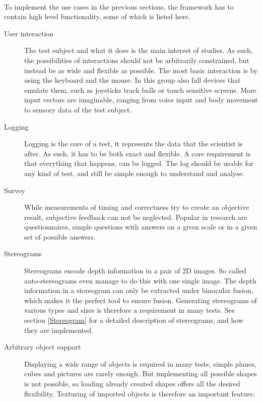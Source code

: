 \paragraph{}
To implement the use cases in the previous sections, the framework has to contain high level functionality, some of which is listed here.

\begin{description}
\item[User interaction]
The test subject and what it does is the main interest of studies.
As such, the possibilities of interactions should not be arbitrarily constrained, but instead be as wide and flexible as possible.
The most basic interaction is by using the keyboard and the mouse.
In this group also fall devices that emulate them, such as joysticks track balls or touch sensitive screens.
More input vectors are imaginable, ranging from voice input and body movement to sensory data of the test subject.

\item[Logging]
Logging is the core of a test, it represents the data that the scientist is after.
As such, it has to be both exact and flexible.
A core requirement is that everything that happens, can be logged.
The log should be usable for any kind of test, and still be simple enough to understand and analyse.

\item[Survey]
While measurements of timing and correctness try to create an objective result, subjective feedback can not be neglected.
Popular in research are questionnaires, simple questions with answers on a given scale or in a given set of possible answers.

\item[Stereograms]
Stereograms encode depth information in a pair of 2D images.
So called auto-stereograms even manage to do this with one single image.
The depth information in a stereogram can only be extracted under binocular fusion, which makes it the perfect tool to ensure fusion.
Generating stereograms of various types and sizes is therefore a requirement in many tests.
See section \ref{Stereogram} for a detailed description of stereograms, and how they are implemented.

\item[Arbitrary object support]
Displaying a wide range of objects is required in many tests, simple planes, cubes and pictures are rarely enough.
But implementing all possible shapes is not possible, so loading already created shapes offers all the desired flexibility.
Texturing of imported objects is therefore an important feature.


\end{description}
